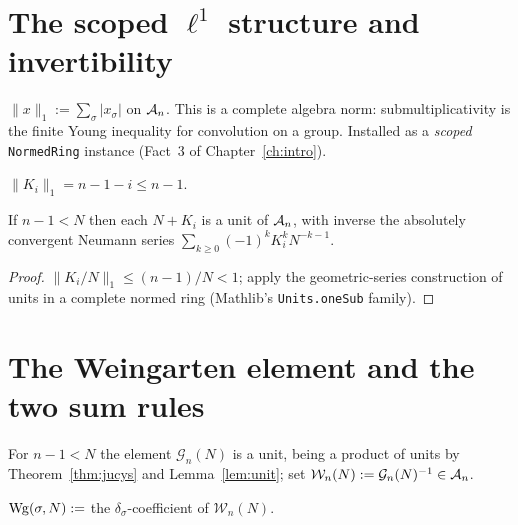 \chapter{The scoped \texorpdfstring{$\ell^1$}{l1} structure and invertibility}\label{ch:l1}

\begin{definition}\label{def:l1}
\leanok
{}
$\|x\|_1:=\sum_{\sigma}|x_\sigma|$ on $\mathcal{A}_{n}$. This is a complete
algebra norm: submultiplicativity is the finite Young inequality for
convolution on a group. Installed as a \emph{scoped} \texttt{NormedRing}
instance (Fact~3 of Chapter~\ref{ch:intro}).
\end{definition}

\begin{lemma}[Norm of $K_i$]\label{lem:jm_norm}
\leanok
{}
$\|K_i\|_1=n-1-i\le n-1$.
\end{lemma}

\begin{lemma}[Invertibility]\label{lem:unit}
\leanok
{}
If $n-1<N$ then each $N+K_i$ is a unit of $\mathcal{A}_{n}$, with inverse the
absolutely convergent Neumann series
$\sum_{k\ge0}(-1)^k K_i^k N^{-k-1}$.
\end{lemma}
\begin{proof}
\leanok
{}
$\|K_i/N\|_1\le(n-1)/N<1$; apply the geometric-series construction of
units in a complete normed ring (Mathlib's \texttt{Units.oneSub} family).
\end{proof}

\chapter{The Weingarten element and the two sum rules}\label{ch:wg}

\begin{definition}\label{def:wgElement}
\leanok
{}
For $n-1<N$ the element $\mathcal G_n(N)$ is a unit, being a product of
units by Theorem~\ref{thm:jucys} and Lemma~\ref{lem:unit}; set
$\mathcal W_n(N):=\mathcal G_n(N)^{-1}\in\mathcal{A}_{n}$.
\end{definition}

\begin{definition}\label{def:wg}
\leanok
{}
$\operatorname{Wg}(\sigma,N):=$ the $\delta_\sigma$-coefficient of $\mathcal W_n(N)$.
\end{definition}

